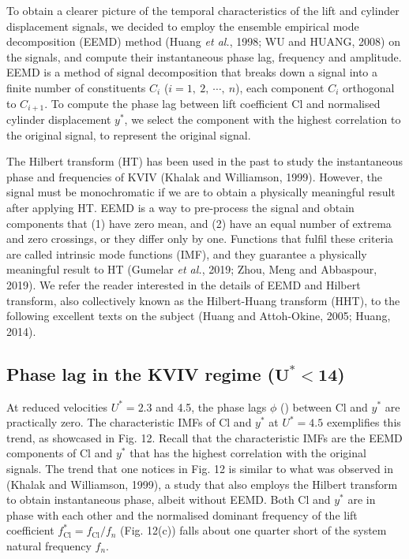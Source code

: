 \documentclass[]{article}
\begin{document}
To obtain a clearer picture of the temporal characteristics of the lift
and cylinder displacement signals, we decided to employ the ensemble
empirical mode decomposition (EEMD) method (Huang \emph{et al.}, 1998;
WU and HUANG, 2008) on the signals, and compute their instantaneous
phase lag, frequency and amplitude. EEMD is a method of signal
decomposition that breaks down a signal into a finite number of
constituents \(C_{i}\) (\(i = 1,\ 2,\ \cdots,\ n\)), each component
\(C_{i}\) orthogonal to \(C_{i + 1}\). To compute the phase lag between
lift coefficient Cl and normalised cylinder displacement \(y^{*}\), we
select the component with the highest correlation to the original
signal, to represent the original signal.

The Hilbert transform (HT) has been used in the past to study the
instantaneous phase and frequencies of KVIV (Khalak and Williamson,
1999). However, the signal must be monochromatic if we are to obtain a
physically meaningful result after applying HT. EEMD is a way to
pre-process the signal and obtain components that (1) have zero mean,
and (2) have an equal number of extrema and zero crossings, or they
differ only by one. Functions that fulfil these criteria are called
intrinsic mode functions (IMF), and they guarantee a physically
meaningful result to HT (Gumelar \emph{et al.}, 2019; Zhou, Meng and
Abbaspour, 2019). We refer the reader interested in the details of EEMD
and Hilbert transform, also collectively known as the Hilbert-Huang
transform (HHT), to the following excellent texts on the subject (Huang
and Attoh-Okine, 2005; Huang, 2014).

\hypertarget{phase-lag-in-the-kviv-regime-mathbfumathbfmathbf-14}{\subsection{\texorpdfstring{Phase
lag in the KVIV regime
(\(\mathbf{U}^{\mathbf{*}}\mathbf{< 14}\))}{Phase lag in the KVIV regime (\textbackslash{}mathbf\{U\}\^{}\{\textbackslash{}mathbf\{*\}\}\textbackslash{}mathbf\{\textless{} 14\})}}\label{phase-lag-in-the-kviv-regime-mathbfumathbfmathbf-14}}

At reduced velocities \(U^{*} = 2.3\) and 4.5, the phase lags \(\phi\)
(\(\)) between Cl and \(y^{*}\) are practically zero. The characteristic
IMFs of Cl and \(y^{*}\) at \(U^{*} = 4.5\) exemplifies this trend, as
showcased in Fig. 12. Recall that the characteristic IMFs are the EEMD
components of Cl and \(y^{*}\) that has the highest correlation with the
original signals. The trend that one notices in Fig. 12 is similar to
what was observed in (Khalak and Williamson, 1999), a study that also
employs the Hilbert transform to obtain instantaneous phase, albeit
without EEMD. Both Cl and \(y^{*}\) are in phase with each other and the
normalised dominant frequency of the lift coefficient
\(f_{\text{Cl}}^{*} = f_{\text{Cl}}/f_{n}\) (Fig. 12(c)) falls about one
quarter short of the system natural frequency \(f_{n}\).
\end{document}
